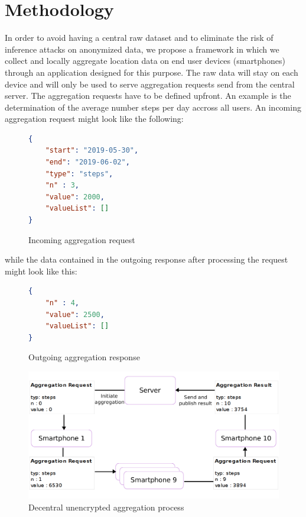 \chapter{Methodology}\label{chapter:method}
In order to avoid having a central raw dataset and to eliminate the risk of inference attacks on anonymized data, we propose a framework in which we collect and locally aggregate location data on end user devices (smartphones) through an application designed for this purpose. The raw data will stay on each device and will only be used to serve aggregation requests send from the central server. The aggregation requests have to be defined upfront. An example is the determination of the average number steps per day accross all users. An incoming aggregation request might look like the following:
\begin{figure}[h!]
\begin{lstlisting}[language=json,firstnumber=1]
{
	"start": "2019-05-30",
	"end": "2019-06-02",
	"type": "steps",
	"n" : 3,
	"value": 2000,
	"valueList": []
}
\end{lstlisting}
\caption{Incoming aggregation request}
\label{incoming-aggregation-request}
\end{figure}
while the data contained in the outgoing response after processing the request might look like this:
\begin{figure}[h!]
\begin{lstlisting}[language=json,firstnumber=1]
{
	"n" : 4,
	"value": 2500,
	"valueList": []
}
\end{lstlisting}
\caption{Outgoing aggregation response}
\label{outgoing-aggregation-response}
\end{figure}
\begin{figure}[h!]
	\caption{Decentral unencrypted aggregation process}
	\label{decentral-aggregation-unencrypted}
	\includegraphics[width=\textwidth]{data/diagrams/decentral-aggregation-6.png}
\end{figure}
